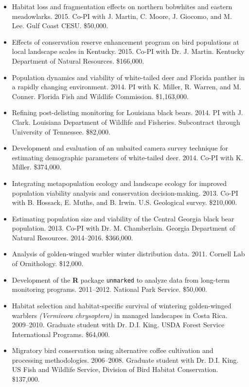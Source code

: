 \documentclass[12pt]{article}
\begin{document}
\begin{itemize}

\item Habitat loss and fragmentation effects on northern bobwhites and
  eastern meadowlarks. 2015. Co-PI with J. Martin, C. Moore,
  J. Giocomo, and M. Lee. Gulf Coast CESU. \$50,000. 

\item Effects of conservation reserve enhancement program on bird
  populations at local landscape scales in Kentucky. 2015. Co-PI with
  Dr. J. Martin. Kentucky Department of Natural Resources. \$166,000.

\item Population dynamics and viability of white-tailed deer and
  Florida panther in a rapidly changing environment. 2014. PI with K.
  Miller, R. Warren, and M. Conner. Florida
  Fish and Wildlife Commission. \$1,163,000. 

\item Refining post-delisting monitoring for Louisiana black
  bears. 2014. PI with J. Clark. Louisiana Department of Wildlife and
  Fisheries. Subcontract through University of Tennessee. \$82,000. 

\item Development and evaluation of an unbaited camera survey
  technique for estimating demographic parameters of white-tailed
  deer. 2014. Co-PI with K. Miller. \$374,000.  

\item Integrating metapopulation ecology and landscape ecology for
  improved population viability analysis and conservation
  decision-making. 2013. Co-PI with B. Hossack, E. Muths, and
  B. Irwin. U.S. Geological survey. \$210,000.

\item Estimating population size and viability of the Central Georgia
  black bear population. 2013. Co-PI with Dr. M. Chamberlain. Georgia
  Department of Natural Resources. 2014--2016. \$366,000. 

\item Analysis of golden-winged warbler winter distribution
  data. 2011. Cornell Lab of Ornithology. \$12,000. 

\item Development of the {\bf R} package {\tt unmarked} to analyze
  data from long-term monitoring programs. 2011--2012. National Park
  Service. \$50,000. 

\item Habitat selection and habitat-specific survival of wintering
  golden-winged warblers {\it (Vermivora chrysoptera)} in managed landscapes
  in Costa Rica. 2009--2010. Graduate student with Dr. D.I. King. USDA
  Forest Service International Programs. \$64,000. 

\item Migratory bird conservation using alternative coffee
  cultivation and processing methodologies. 2006--2008. Graduate
  student with Dr. D.I. King. US Fish and Wildlife Service, Division
  of Bird Habitat Conservation. \$137,000. 

\end{itemize}
\end{document}
